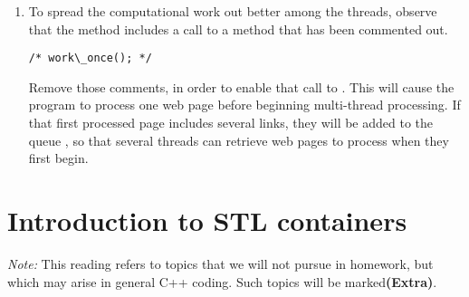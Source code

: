 \documentclass[letterpaper,10pt,openany,oneside]{sphinxmanual}
\begin{document}
\begin{enumerate}
\begin{itemize}
\begin{Verbatim}[commandchars=\\\{\}]
\% bin/spider 100 4 www.stolaf.edu \textbar{} more
\end{Verbatim}

Each thread is programmed to print a message such as

\begin{Verbatim}[commandchars=\\\{\}]
Thread 2 finished after processing 29 URLs
\end{Verbatim}

when it completes.

\item {} 
You will probably find that a small number of threads processed
all of the URLs, and that the other threads finished early without
doing any work. How many threads processed URLs in your run? Can
you think of a reason why the others finished early without
processing any URLs? (\emph{Hint:} Think about the work queue near the
beginning of the program, just as the threads are starting their
work.)

\end{itemize}

\item {} 
To spread the computational work out better among the threads,
observe that the method  includes a call to a
method  that has been commented out.

\begin{Verbatim}[commandchars=\\\{\}]
/* work\_once(); */
\end{Verbatim}

Remove those comments, in order to enable that call to
 . This will cause the program to process one web
page before beginning multi-thread processing. If that first
processed page includes several links, they will be added to the
queue , so that several threads can retrieve web pages to
process when they first begin.

\end{enumerate}


\chapter{Introduction to STL containers}
\label{IntroSTLContainers/introduction_stl_containers:introduction-to-stl-containers}\label{IntroSTLContainers/introduction_stl_containers::doc}
\emph{Note:} This reading refers to topics that we will not pursue in
homework, but which may arise in general C++ coding. Such topics will be
marked\textbf{(Extra)}.
\end{document}
